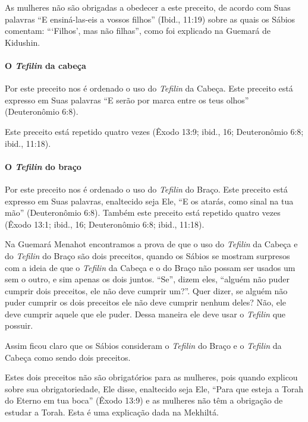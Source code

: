 As mulheres não são obrigadas a obedecer a este preceito, de acordo com
Suas palavras ``E ensiná-las-eis a vossos filhos'' (Ibid., 11:19) sobre
as quais os Sábios comentam: ```Filhos', mas não filhas'', como foi
explicado na Guemará de Kidushin.

\paragraph{O \textit{Tefilin} da cabeça}

Por este preceito nos é ordenado o uso do \textit{Tefilin} da Cabeça. Este
preceito está expresso em Suas palavras ``E serão por marca entre os
teus olhos'' (Deuteronômio 6:8).

Este preceito está repetido quatro vezes (Êxodo 13:9; ibid., 16;
Deuteronômio 6:8; ibid., 11:18).

\paragraph{O \textit{Tefilin} do braço}

Por este preceito nos é ordenado o uso do \textit{Tefilin} do Braço. Este
preceito está expresso em Suas palavras, enaltecido seja Ele, ``E os
atarás, como sinal na tua mão'' (Deuteronômio 6:8). Também este preceito
está repetido quatro vezes (Êxodo 13:1; ibid., 16; Deuteronômio 6:8;
ibid., 11:18).

Na Guemará Menahot encontramos a prova de que o uso do \textit{Tefilin} da
Cabeça e do \textit{Tefilin} do Braço são dois preceitos, quando os Sábios se
mostram surpresos com a ideia de que o \textit{Tefilin} da Cabeça e o do
Braço não possam ser usados um sem o outro, e sim apenas os dois juntos.
``Se'', dizem eles, ``alguém não puder cumprir dois preceitos, ele não
deve cumprir um?''. Quer dizer, se alguém não puder cumprir os dois
preceitos ele não deve cumprir nenhum deles? Não, ele deve cumprir
aquele que ele puder. Dessa maneira ele deve usar o \textit{Tefilin} que
possuir.

Assim ficou claro que os Sábios consideram o \textit{Tefilin} do Braço e o
\textit{Tefilin} da Cabeça como sendo dois preceitos.

Estes dois preceitos não são obrigatórios para as mulheres, pois quando
explicou sobre sua obrigatoriedade, Ele disse, enaltecido seja Ele,
``Para que esteja a Torah do Eterno em tua boca'' (Êxodo 13:9) e as
mulheres não têm a obrigação de estudar a Torah. Esta é uma explicação
dada na Mekhiltá.

